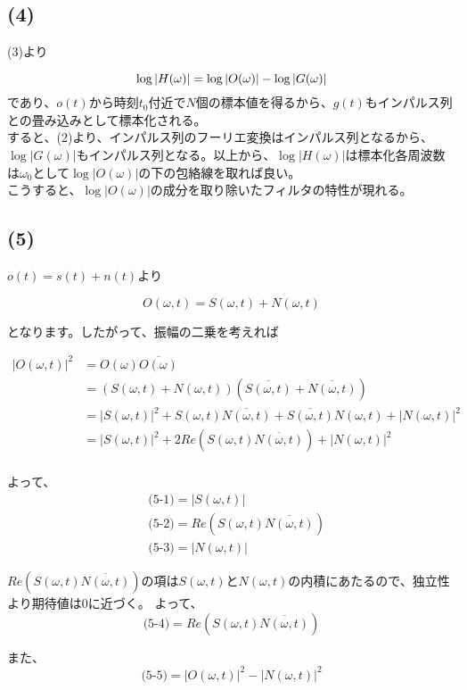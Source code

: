 \documentclass[a4paper,12pt,xelatex,ja=standard]{bxjsarticle}
\begin{document}
\subsection*{(4)}
(3)より

\[
  \log |H(\omega)| = \log |O(\omega)| - \log |G(\omega)| \\
\]
であり、$o(t)$から時刻$t_0$付近で$N$個の標本値を得るから、$g(t)$もインパルス列との畳み込みとして標本化される。\\
すると、(2)より、インパルス列のフーリエ変換はインパルス列となるから、$\log | G(\omega) |$もインパルス列となる。以上から、$\log | H(\omega) |$は標本化各周波数は$\omega_0$として$\log |O(\omega)|$の下の包絡線を取れば良い。\\
こうすると、$\log | O(\omega) |$の成分を取り除いたフィルタの特性が現れる。

\subsection*{(5)}
$o(t) = s(t) + n(t)$より

\[
  O(\omega, t) = S(\omega, t) + N(\omega, t)
\]

となります。したがって、振幅の二乗を考えれば

\begin{equation*}
  \begin{split}
    | O(\omega, t) |^2
      &= O(\omega) \overline{O(\omega)} \\
      &= (S(\omega, t) + N(\omega, t))\left(\overline{S(\omega, t)} + \overline{N(\omega, t)}\right) \\
      &= |S(\omega, t)|^2 + S(\omega, t) \overline{N(\omega, t)} + \overline{S(\omega, t)}N(\omega, t) + |N(\omega, t)|^2 \\
      &= |S(\omega, t)|^2 + 2Re(S(\omega, t) \overline{N(\omega, t)}) + |N(\omega, t)|^2 \\
  \end{split}
\end{equation*}

よって、
\begin{equation*}
  \begin{split}
    &\text{(5-1)} = |S(\omega, t)| \\
    &\text{(5-2)} = Re(S(\omega, t) \overline{N(\omega, t)})\\
    &\text{(5-3)} = |N(\omega, t)|
  \end{split}
\end{equation*}

$Re(S(\omega, t) \overline{N(\omega, t)})$の項は$S(\omega, t)$と$N(\omega, t)$の内積にあたるので、独立性より期待値は0に近づく。
よって、
\[
  \text{(5-4)} = Re(S(\omega, t) \overline{N(\omega, t)})
\]

また、
\[
  \text{(5-5)} = |O(\omega, t)|^2 - |N(\omega, t)|^2
\]
\end{document}

